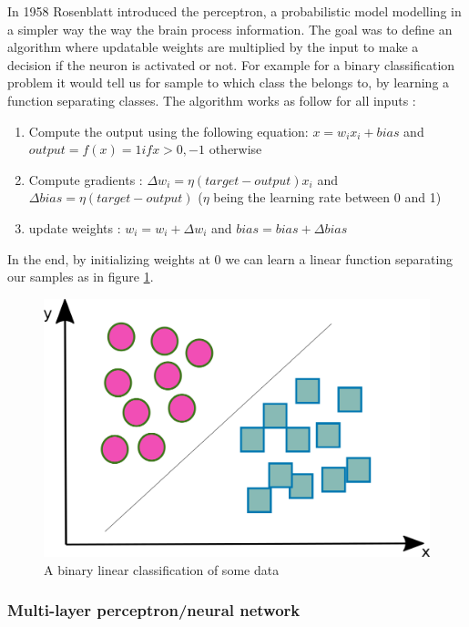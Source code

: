 In 1958 Rosenblatt introduced the perceptron, a probabilistic model modelling in a simpler way the way the brain process information. The goal was to define an algorithm where updatable weights are multiplied by the input to make a decision if the neuron is activated or not. For example for a binary classification problem it would tell us for sample to which class the belongs to, by learning a function separating classes.
The algorithm works as follow for all inputs :
\begin{enumerate}
    \item  Compute the output using the following equation: $x =w_ix_i + bias$ and $output = f(x) = 1 if x >0, -1$ otherwise
    \item Compute gradients : $\Delta w_i = \eta(target - output) x_i$ and $\Delta bias = \eta(target - output)$ ($\eta$ being the learning rate between 0 and 1)
    \item update weights : $w_i = w_i +\Delta w_i$ and $bias = bias + \Delta bias$
\end{enumerate}

In the end, by initializing weights at 0 we can learn a linear function separating our samples as in figure \ref{fig:class}.
\begin{figure}[ht!]
   \centerline{\includegraphics[scale=0.25]{./pics/linear.png}}
   \caption{A binary linear classification of some data}
   \label{fig:class}
\end{figure}

\subsubsection{Multi-layer perceptron/neural network}

